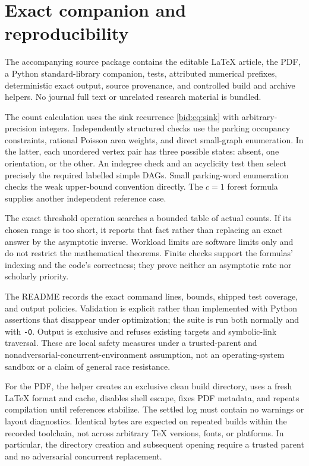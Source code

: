 \documentclass[11pt,letterpaper]{article}
\numberwithin{equation}{section}
\theoremstyle{remark}\newtheorem{remark}[theorem]{Remark}
\begin{document}
\section{Exact companion and reproducibility}\label{bid:sec:companion}
The accompanying source package contains the editable LaTeX article,
the PDF, a Python standard-library companion, tests, attributed numerical
prefixes, deterministic exact output, source provenance, and controlled
build and archive helpers. No journal full text or unrelated research
material is bundled.

The count calculation uses the sink recurrence
\eqref{bid:eq:sink} with arbitrary-precision integers. Independently
structured checks use the parking occupancy constraints, rational
Poisson area weights, and direct small-graph enumeration. In the latter,
each unordered vertex pair has three possible states: absent, one
orientation, or the other. An indegree check and an acyclicity test then
select precisely the required labelled simple DAGs. Small parking-word
enumeration checks the weak upper-bound convention directly. The
$c=1$ forest formula supplies another independent reference case.

The exact threshold operation searches a bounded table of actual
counts. If its chosen range is too short, it reports that fact rather
than replacing an exact answer by the asymptotic inverse. Workload
limits are software limits only and do not restrict the mathematical
theorems. Finite checks support the formulas' indexing and the code's
correctness; they prove neither an asymptotic rate nor scholarly
priority.

The README records the exact command lines, bounds, shipped test
coverage, and output policies. Validation is explicit rather than
implemented with Python assertions that disappear under optimization;
the suite is run both normally and with \texttt{-O}. Output is
exclusive and refuses existing targets and symbolic-link traversal.
These are local safety measures under a trusted-parent and
nonadversarial-concurrent-environment assumption, not an operating-system
sandbox or a claim of general race resistance.

For the PDF, the helper creates an exclusive clean build directory,
uses a fresh LaTeX format and cache, disables shell escape, fixes PDF
metadata, and repeats compilation until references stabilize. The
settled log must contain no warnings or layout diagnostics. Identical
bytes are expected on repeated builds within the recorded toolchain,
not across arbitrary TeX versions, fonts, or platforms. In particular,
the directory creation and subsequent opening require a trusted parent
and no adversarial concurrent replacement.
\end{document}
